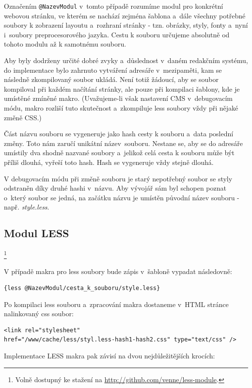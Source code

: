 \documentclass[thesis=B,czech]{FITthesis}[2012/06/26]
\begin{document}
Označením \verb#@NazevModul# v~tomto případě rozumíme modul pro konkrétní webovou stránku, ve kterém se nachází zejména  šablona a~dále všechny potřebné soubory k zobrazení layoutu a~rozhraní stránky - tzn. obrázky, styly, fonty a~nyní i~soubory preprocesorového jazyka. Cestu k souboru určujeme absolutně od tohoto modulu až k samotnému souboru.

Aby byly dodrženy určité dobré zvyky a~důslednost v~daném redakčním systému, do implementace bylo zahrnuto vytváření adresáře v~mezipaměti, kam se následně zkompilovaný soubor ukládá. Není totiž žádoucí, aby se soubor kompiloval při každém načítání stránky, ale pouze při kompilaci šablony, kde je umístěné zmíněné makro. (Uvažujeme-li však nastavení CMS v~debugovacím módu, makro rozliší tuto skutečnost a~zkompiluje less soubory vždy při nějaké změně CSS.)  

Část názvu souboru se vygeneruje jako hash cesty k souboru a~data poslední změny. Toto nám zaručí unikátní název~souboru. Nestane se, aby se do adresáře umístily dva shodně nazvané soubory a~jelikož celá cesta k souboru může být příliš dlouhá, vyřeší toto hash. Hash se vygeneruje vždy stejně dlouhá.

V debugovacím módu při změně souboru je starý nepotřebný soubor se styly odstraněn díky druhé hashi v~názvu. Aby vývojář sám byl schopen poznat o~který soubor se jedná, na začátku názvu je umístěn původní název souboru - např. \textit{style.less}.



\subsection{Modul LESS}\footnote{Volně dostupný ke stažení na \url{http://github.com/venne/less-module}.}

V případě makra pro less soubory bude zápis v~šabloně vypadat následovně:
\scriptsize
\begin{verbatim}
{less @NazevModul/cesta_k_souboru/style.less}
\end{verbatim}
\normalsize
Po kompilaci less souboru a~zpracování makra dostaneme v~HTML stránce nalinkovaný css soubor:
\scriptsize
\begin{verbatim}
<link rel="stylesheet"
href="/www/cache/less/styl.less-hash1-hash2.css" type="text/css" />
\end{verbatim}
\normalsize
Implementace LESS makra pak závisí na dvou nejdůležitějších krocích:
\end{document}
